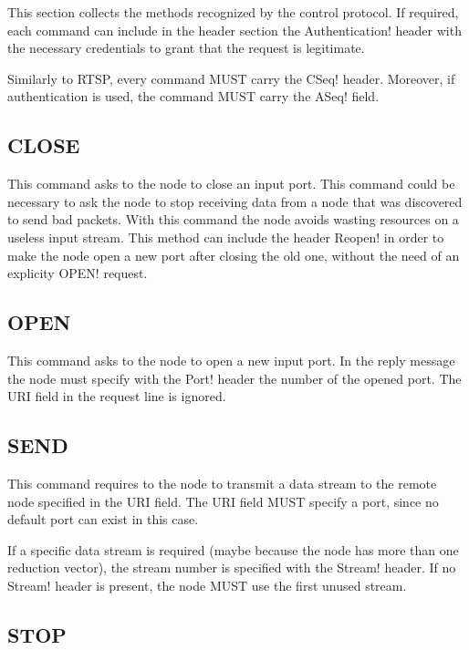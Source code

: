 \documentclass{rfc}
\begin{document}
This section collects the methods recognized by the control protocol.
If required, each command can include in the header section the \ttt
Authentication! header with the necessary credentials to grant that
the request is legitimate.

Similarly to RTSP, every command MUST carry the \ttt CSeq! header.
Moreover, if authentication is used, the command MUST carry the \ttt
ASeq! field. 

\subsection{CLOSE}
\label{subsub:7.0.2;transport_layer}

This command asks to the node to close an input port.  This command
could be necessary to ask the node to stop receiving data from a node
that was discovered to send bad packets.  With this command the node
avoids wasting resources on a useless input stream.  This method can
include the header \ttt Reopen! in order to make the node open a new
port after closing the old one, without the need of an explicity \ttt
OPEN! request.

\subsection{OPEN}
\label{subsub:7.0.3;transport_layer}

This command asks to the node to open a new input port.  In the reply
message the node must specify with the \ttt Port! header the number of
the opened port.  The URI field in the request line is ignored.

\subsection{SEND}
\label{subsub:7.0.0;transport_layer}

This command requires to the node to transmit a data stream to the
remote node specified in the URI field.  The URI field MUST specify a
port, since no default port can exist in this case.

If a specific data stream is required (maybe because the node has more
than one reduction vector), the stream number is specified with the
\ttt Stream! header.  If no \ttt Stream! header is present, the node
MUST use the first unused stream.

\subsection{STOP}
\label{subsub:7.0.1;transport_layer}
\end{document}
